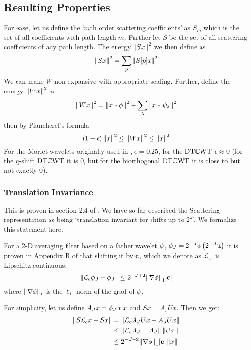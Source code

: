 \subsection{Resulting Properties}
For ease, let us define the `$m$th order scattering coefficients' as $S_m$ which
is the set of all coefficients with path length $m$. Further let $S$ be the set
of all scattering coefficients of any path length. The energy $\left\lVert Sx \right\rVert^2$ we 
then define as
\begin{equation}
  \left\lVert Sx \right\rVert^2 = \sum_p \left\lVert S[p]x \right\rVert^2
\end{equation}
We can make $W$ non-expansive with appropriate scaling. Further, define the energy $\left\lVert Wx \right\rVert^2$ as
\begin{equation}
  \left\lVert Wx \right\rVert^2 = \left\lVert x\ast \phi \right\rVert^2 + \sum_\lambda \left\lVert x \ast
  \psi_\lambda \right\rVert^2 
\end{equation}
then by Plancherel's formula
\begin{equation}
  (1-\epsilon)\left\lVert x \right\rVert^2 \leq \left\lVert Wx \right\rVert^2 \leq \left\lVert x \right\rVert^2
\end{equation}
For the Morlet wavelets originally used in \cite{bruna_invariant_2013},
$\epsilon=0.25$, for the $\mathrm{DT}\mathbb{C}\mathrm{WT}$ $\epsilon \approx 0$ (for the q-shift $\mathrm{DT}\mathbb{C}\mathrm{WT}$
it is 0, but for the biorthogonal $\mathrm{DT}\mathbb{C}\mathrm{WT}$ it is close to but not exactly 0).


\subsubsection{Translation Invariance}
\newcommand{\shift}{\mathcal{L}_c}

This is proven in section 2.4 of \cite{mallat_group_2012}. We
have so far described the Scattering representation as being `translation
invariant for shifts up to $2^J$'. We formalize this statement here.

For a 2-D averaging filter based on a father wavelet $\phi$, 
$\phi_J = 2^{-J}\phi\left(2^{-J}\mathbf{u}\right)$ it is proven in Appendix B of
\cite{mallat_group_2012} that shifting 
it by $\mathbf{c}$, which we denote as $\mathcal{L}_c$, is Lipschitz continuous:
\begin{equation}
  \norm{\shift \phi_J - \phi_J} \leq 2^{-J+2}\lnorm{\nabla \phitd}{1}|\bmu{c}|
\end{equation}
where ${\left\lVert \nabla \phi \right\rVert}_{1}$ is the $\ell_1$ norm of the grad of $\phi$.

For simplicity, let us define $A_J x = \phi_J \ast x$ and $Sx = A_J Ux$. Then we get:
\begin{align}
  \norm{S\shift x - Sx} & = \norm{\shift A_J Ux - A_J Ux} \\
                         &\leq \norm{\shift A_J - A_J}\norm{Ux} \\
                         & \leq 2^{-J+2}\lnorm{\nabla \phitd}{1}|\bmu{c}|\norm{x}
\end{align}


